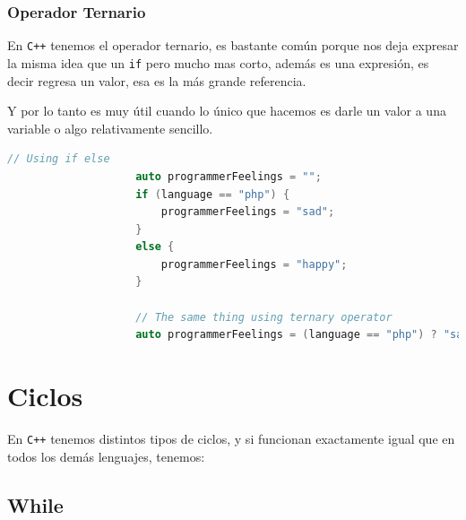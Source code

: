 \documentclass[12pt, fleqn]{report}                             %
\theoremstyle{break}                                            %
\newcommand{\textCode}[1]  { \texttt{#1} }                      %
\newcommand \Cpp  {\textCode{C++} }                               %
\begin{document}
                \clearpage
                \subsubsection{Operador Ternario}

                En \Cpp tenemos el operador ternario, es bastante común porque nos deja expresar la misma
                idea que un \textCode{if} pero mucho mas corto, además es una expresión, es decir
                regresa un valor, esa es la más grande referencia.

                Y por lo tanto es muy útil cuando lo único que hacemos es darle un valor a una variable
                o algo relativamente sencillo.

                \begin{lstlisting}[language=C++, gobble=20]
                    // Using if else
                    auto programmerFeelings = "";
                    if (language == "php") {
                        programmerFeelings = "sad";
                    }
                    else {
                        programmerFeelings = "happy";
                    }

                    // The same thing using ternary operator
                    auto programmerFeelings = (language == "php") ? "sad" : "happy";
                \end{lstlisting}
                
        \clearpage
        \section{Ciclos}
            
            En \Cpp tenemos distintos tipos de ciclos, y si funcionan exactamente igual que
            en todos los demás lenguajes, tenemos:

            
            \subsection{While}
\end{document}
